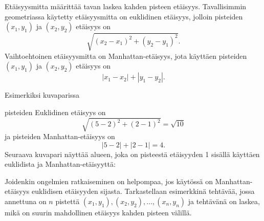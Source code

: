 
Etäisyysmitta määrittää tavan laskea kahden pisteen etäisyys.
Tavallisimmin geometriassa käytetty etäisyysmitta on
euklidinen etäisyys, jolloin pisteiden
$(x_1,y_1)$ ja $(x_2,y_2)$ etäisyys on
\[\sqrt{(x_2-x_1)^2+(y_2-y_1)^2}.\]
Vaihtoehtoinen etäisyysmitta on Manhattan-etäisyys,
jota käyttäen pisteiden
$(x_1,y_1)$ ja $(x_2,y_2)$ etäisyys on
\[|x_1-x_2|+|y_1-y_2|.\]
\begin{samepage}
Esimerkiksi kuvaparissa
\begin{center}
\end{center}
\end{samepage}
pisteiden Euklidinen etäisyys on
\[\sqrt{(5-2)^2+(2-1)^2}=\sqrt{10}\]
ja pisteiden Manhattan-etäisyys on
\[|5-2|+|2-1|=4.\]
Seuraava kuvapari näyttää alueen, joka on pisteestä etäisyyden 1
sisällä käyttäen euklidista ja Manhattan-etäisyyttä:
\begin{center}
\end{center}
Joidenkin ongelmien ratkaiseminen on helpompaa, jos käytössä on
Manhattan-etäisyys euklidisen etäisyyden sijasta.
Tarkastellaan esimerkkinä tehtävää, jossa annettuna
on $n$ pistettä $(x_1,y_1),(x_2,y_2),\ldots,(x_n,y_n)$
ja tehtävänä on laskea, mikä on suurin mahdollinen etäisyys
kahden pisteen välillä.

